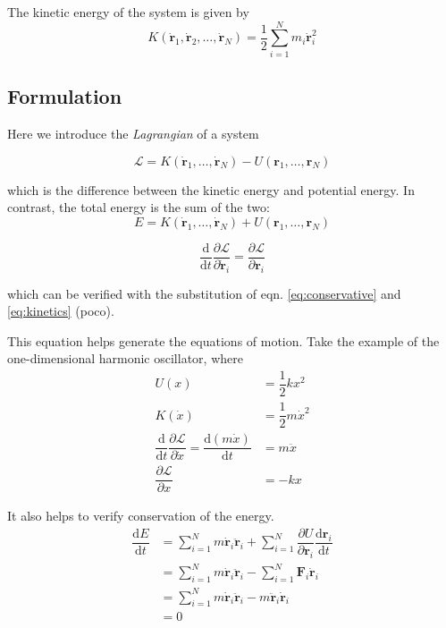 \documentclass[
  10pt,
  twoside,
  openany,
  b5paper, %
  colorscheme = bootstrap-v4, %
]{qyxf-book}
\newcommand{\der}[2]{\dfrac{\md #1}{\md #2}}
\newcommand{\p}[2]{\dfrac{\partial #1}{\partial #2}}
\newcommand{\md}{\mathrm{d}}
\newcommand{\vF}{\boldsymbol{F}}
\newcommand{\vr}{\boldsymbol{r}}
\newcommand{\dvr}{\dot{\vr}}
\newcommand{\ddvr}{\ddot{\vr}}
\newcommand{\half}{\dfrac{1}{2}}
\newcommand{\sumin}{\sum_{i=1}^N}
\newcommand{\lag}{\mathcal{L}} %
\begin{document}
The kinetic energy of the system is given by
\begin{equation}
	K(\dvr_1, \dvr_2, \dots, \dvr_N)=\half\sum_{i=1}^{N}m_i\dvr_i^2 \label{eq:kinetics}
\end{equation}

\subsection{Formulation}
Here we introduce the \textit{Lagrangian} of a system
\begin{tcolorbox}
	\begin{equation}
		\lag=K(\dvr_1, \dots, \dvr_N)-U(\vr_1, \dots, \vr_N)
	\end{equation}
\end{tcolorbox}
which is the difference between the kinetic energy and potential energy. In contrast, the total energy is the sum of the two:
\begin{equation}
	E=K(\dvr_1, \dots, \dvr_N)+U(\vr_1, \dots, \vr_N)
\end{equation}

\begin{tcolorbox}[title={The Euler-Lagrangian equation}]
	\begin{equation}
		\der{}{t}\p{\lag}{\dvr_i}=\p{\lag}{\vr_i} \label{eq:euler-lagrangian}
	\end{equation}
\end{tcolorbox}
which can be verified with the substitution of eqn. \ref{eq:conservative} and \ref{eq:kinetics} (poco).

This equation helps generate the equations of motion. Take the example of the one-dimensional harmonic oscillator, where
\begin{align*}
	U(x)&=\half kx^2\\
	K(\dot{x})&=\half m\dot{x}^2\\
	\der{}{t}\p{\lag}{\dot{x}}=\der{(m\dot{x})}{t}&=m\ddot{x}\\
	\p{\lag}{x}&=-kx
\end{align*}

It also helps to verify conservation of the energy.
\begin{align*}
	\der{E}{t}&=\sumin m\dvr_i\ddvr_i+\sumin\p{U}{\vr_i}\der{\vr_i}{t}\\
	&=\sumin m\dvr_i\ddvr_i-\sumin\vF_i\dvr_i\\
	&=\sumin m\dvr_i\ddvr_i-m\ddvr_i\dvr_i\\
	&=0
\end{align*}
\end{document}

